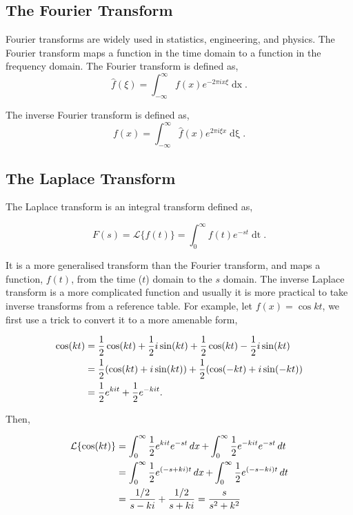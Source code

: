 \documentclass[11pt]{amsart}
\begin{document}
\subsection{The Fourier Transform}

Fourier transforms are widely used in statistics, engineering, and physics. The Fourier transform maps a function in the time domain to a function in the frequency domain. The Fourier transform is defined as,
$$\hat{f}(\xi) = \int_{-\infty}^{\infty}f(x)e^{-2\pi ix\xi}\mathop{dx}.$$

The inverse Fourier transform is defined as,
$$f(x) = \int_{-\infty}^{\infty}\hat{f}(x)e^{2\pi i\xi x}\mathop{d\xi}.$$

\subsection{The Laplace Transform}

The Laplace transform is an integral transform defined as,

$$F(s) = \mathcal{L}\{f(t)\} = \int_{0}^{\infty} f(t)e^{-st}\mathop{dt}.$$

It is a more generalised transform than the Fourier transform, and maps a function, $f(t)$, from the time ($t$) domain to the $s$ domain. The inverse Laplace transform is a more complicated function and usually it is more practical to take inverse transforms from a reference table. For example, let $f(x) = \cos kt$, we first use a trick to convert it to a more amenable form,

\begin{align}
\cos(kt) &= \frac{1}{2}\cos(kt) + \frac{1}{2}i\sin(kt) + \frac{1}{2}\cos(kt) - \frac{1}{2}i\sin(kt) \notag \\
&= \frac{1}{2}(\cos(kt) + i\sin(kt)) + \frac{1}{2}(\cos(-kt) + i\sin(-kt)) \notag \\
&= \frac{1}{2}e^{kit} + \frac{1}{2}e^{-kit}. \notag
\end{align}

Then,

\begin{align}
\mathcal{L}\{\cos(kt)\} &= \int_{0}^{\infty} \frac{1}{2}e^{kit}e^{-st} \mathop{dx} + \int_{0}^{\infty} \frac{1}{2}e^{-kit}e^{-st} \mathop{dt} \notag \\
&= \int_{0}^{\infty} \frac{1}{2}e^{(-s + ki)t} \mathop{dx} + \int_{0}^{\infty} \frac{1}{2}e^{(-s - ki)t}\mathop{dt} \notag \\
&= \frac{1/2}{s - ki} + \frac{1/2}{s + ki} = \frac{s}{s^2 + k^2} \notag
\end{align}
\end{document}
